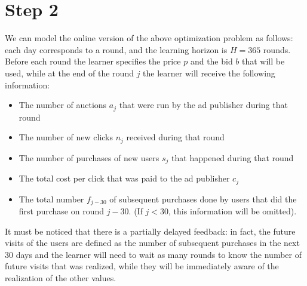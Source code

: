 \documentclass[11pt]{article} %
\begin{document}
\section{Step 2}
We can model the online version of the above optimization problem as follows: each day corresponds to a round, and the learning horizon is $H=365$ rounds. Before each round the learner specifies the price $p$ and the bid $b$ that will be used, while at the end of the round $j$ the learner will receive the following information:
\begin{itemize}
\item The number of auctions $a_j$ that were run by the ad publisher during that round
\item The number of new clicks  $n_j$ received during that round
\item The number of purchases of new users $s_j$ that happened during that round 
\item The total cost per click that was paid to the ad publisher $c_j$
\item The total number $f_{j-30}$ of subsequent purchases done by users that did the first purchase on round $j-30$. (If $j < 30$, this information will be omitted).
\end{itemize}
It must be noticed that there is a partially delayed feedback: in fact, the future visits of the users are defined as the number of subsequent purchases in the next 30 days and the learner will need to wait as many rounds to know the number of future visits that was realized, while they will be immediately aware of the realization of the other values.\\
\end{document}
